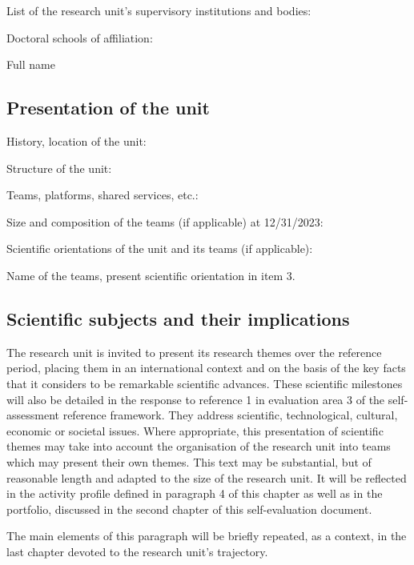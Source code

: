 List of the research unit's supervisory institutions and bodies:

Doctoral schools of affiliation:

\begin{hceresinstructions}
  Full name
\end{hceresinstructions}

\subsection{Presentation of the unit}

History, location of the unit:

Structure of the unit:

Teams, platforms, shared services, etc.:

Size and composition of the teams (if applicable) at 12/31/2023:

Scientific orientations of the unit and its teams (if applicable):

\begin{hceresinstructions}
  Name of the teams, present scientific orientation in item 3.
\end{hceresinstructions}

\subsection{Scientific subjects and their implications}

\begin{hceresinstructions}
  The research unit is invited to present its research themes over the reference
  period, placing them in an international context and on the basis of the key
  facts that it considers to be remarkable scientific advances. These scientific
  milestones will also be detailed in the response to reference 1 in evaluation
  area 3 of the self-assessment reference framework. They address scientific,
  technological, cultural, economic or societal issues. Where appropriate, this
  presentation of scientific themes may take into account the organisation of
  the research unit into teams which may present their own themes. This text may
  be substantial, but of reasonable length and adapted to the size of the
  research unit. It will be reflected in the activity profile defined in
  paragraph 4 of this chapter as well as in the portfolio, discussed in the
  second chapter of this self-evaluation document.

  The main elements of this paragraph will be briefly repeated, as a
  context, in the last chapter devoted to the research
  unit's trajectory.
\end{hceresinstructions}

